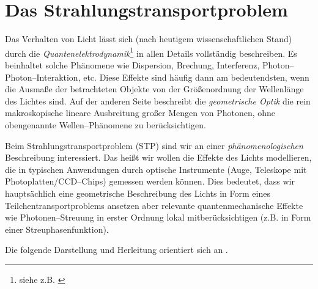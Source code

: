 	\chapter{Das Strahlungstransportproblem}
	\label{sec:radiative_transfer}
	
	Das Verhalten von Licht lässt sich (nach heutigem wissenschaftlichen Stand) durch die {\em Quantenelektrodynamik}\footnote{siehe z.B. \citet{Feynman:1990p11684}} in allen Details vollständig beschreiben. Es beinhaltet solche Phänomene wie Dispersion, Brechung, Interferenz, Photon--Photon--Interaktion, etc. Diese Effekte sind häufig dann am bedeutendsten, wenn die Ausmaße der betrachteten Objekte von der Größenordnung der Wellenlänge des Lichtes sind. Auf der anderen Seite beschreibt die {\em geometrische Optik} die rein makroskopische lineare Ausbreitung großer Mengen von Photonen, ohne obengenannte Wellen--Phänomene zu berücksichtigen.
	
	Beim Strahlungstransportproblem (STP) sind wir an einer {\em phänomenologischen} Beschreibung interessiert. Das heißt wir wollen die Effekte des Lichts modellieren, die in typischen Anwendungen durch optische Instrumente (Auge, Teleskope mit Photoplatten/CCD--Chips) gemessen werden können. Dies bedeutet, dass wir hauptsächlich eine geometrische Beschreibung des Lichts in Form eines Teilchentransportproblems ansetzen aber relevante quantenmechanische Effekte wie Photonen--Streuung in erster Ordnung lokal mitberücksichtigen (z.B. in Form einer Streuphasenfunktion).
	
	Die folgende Darstellung und Herleitung orientiert sich an \citep{Arvo:1993p9035}.
	
